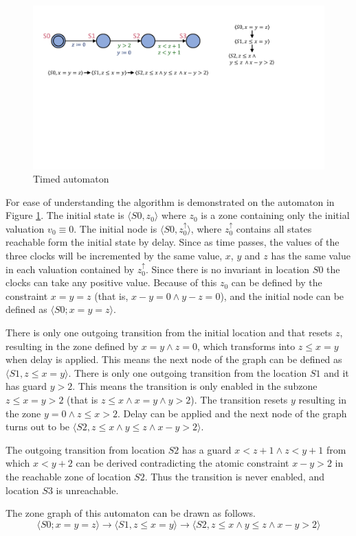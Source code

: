 \begin{figure} 
	\centering
	\includegraphics[width=.7\textwidth]{include/figures/splitexample_aut}
	\caption{Timed automaton}
	\label{fig:splitex}
\end{figure}

\begin{example}


For ease of understanding the algorithm is demonstrated on the automaton in Figure \ref{fig:splitex}. The initial state is  $\langle S0, z_0 \rangle$ where $z_0$ is a zone containing only the initial valuation $v_0 \equiv 0$. The initial node is  $\langle S0, z_0^\uparrow  \rangle$, where $z_0^\uparrow$ contains all states reachable form the initial state by delay. Since as time passes, the values of the three clocks will be incremented by the same value, $x$, $y$ and $z$ has the same value in each valuation contained by $z_0^\uparrow$. Since there is no invariant in location $S0$ the clocks can take any positive value. Because of this $z_0$ can be defined by the constraint $x=y=z$ (that is, $x-y = 0 \wedge y-z=0 $), and the initial node can be defined as $\langle S0; x=y=z  \rangle$.

There is only one outgoing transition from the initial location and that resets $z$, resulting in the zone defined by $x=y \wedge z=0$, which transforms into $z \leq x=y$ when delay is applied. This means the next node of the graph can be defined as $\langle S1, z \leq x=y \rangle$. There is only one outgoing transition from the location $S1$ and it has guard $y>2$. This means the transition is only enabled in the subzone $z \leq x=y>2$ (that is $z \leq x \wedge x=y \wedge y>2$). The transition resets $y$ resulting in the zone $y=0 \wedge z \leq x > 2$. Delay can be applied and the next node of the graph turns out to be $\langle S2, z \leq x \wedge y \leq z \wedge x-y>2 \rangle$.

The outgoing transition from location $S2$ has a guard $x<z+1 \wedge z<y+1$ from which $x<y+2$ can be derived contradicting the atomic constraint $x-y>2$ in the reachable zone of location $S2$. Thus the transition is never enabled, and location $S3$ is unreachable.

The zone graph of this automaton can be drawn as follows.\[\langle S0; x=y=z  \rangle \to \langle S1, z \leq x=y \rangle \to \langle S2, z \leq x \wedge y \leq z \wedge x-y>2 \rangle \]

\end{example}

